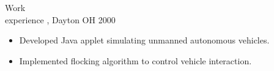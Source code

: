 \begin{category}{Work \\experience}
, Dayton OH  2000 
\begin{itemize}
\item Developed Java applet simulating unmanned autonomous vehicles.
\item Implemented flocking algorithm to control vehicle interaction.
\end{itemize}
\fi


\end{category}
